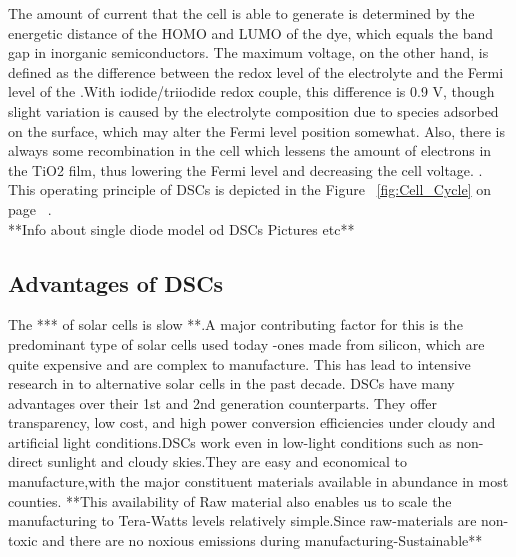 The amount of current that the cell is able to generate is determined by the energetic distance of the \ac{HOMO} and \ac{LUMO} of the dye, which equals the band gap in inorganic semiconductors. The maximum voltage, on the other hand, is defined as the difference between the redox level of the electrolyte and the Fermi level of the .With iodide/triiodide redox couple, this difference is 0.9 V, though slight variation is caused by the electrolyte composition due to species adsorbed on the  surface, which may alter the Fermi level position somewhat. Also, there is always some recombination in the cell which lessens the amount of electrons in the TiO2 film, thus lowering the Fermi level and decreasing the cell voltage. \cite{toivola2010dye}.  This operating principle of \ac{DSCs} is depicted in the Figure ~\ref{fig:Cell_Cycle} on page ~\pageref{fig:Cell_Cycle}. \\


**Info about single diode model od DSCs Pictures etc** \newline



 \subsection{Advantages of DSCs }
  
  The *** of solar cells is slow **.A major contributing factor for this is the predominant type of solar cells used today -ones made from silicon, which are quite expensive and are complex to manufacture. This has lead to intensive research in to alternative solar cells in the past decade. \ac{DSCs} have many advantages over their 1st and 2nd generation counterparts. They offer transparency, low cost, and high power conversion efficiencies under cloudy and artificial light conditions.\ac{DSCs} work even in low-light conditions such as non-direct sunlight and cloudy skies.They are easy and economical to manufacture,with the major constituent materials available in abundance in most counties. **This availability of Raw material also enables us to scale the manufacturing to Tera-Watts levels relatively simple.Since raw-materials are non-toxic and there are no noxious emissions during manufacturing-Sustainable**\\
  
 
  
